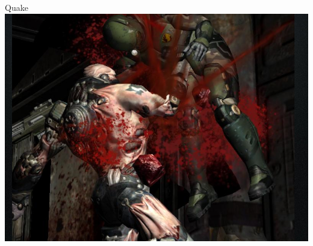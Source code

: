 \documentclass{beamer}
\begin{document}
\begin{frame}{Quake}
\includegraphics[scale=0.4]{img/quake.png}
\end{frame}
\end{document}
